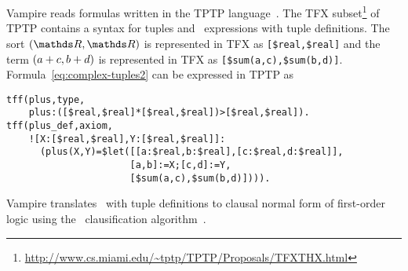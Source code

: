 Vampire reads formulas written in the TPTP language~\cite{tff0}. The TFX subset\footnote{\url{http://www.cs.miami.edu/~tptp/TPTP/Proposals/TFXTHX.html}} of TPTP contains a syntax for tuples and \LETIN\ expressions with tuple definitions. The sort $(\R,\R)$ is represented in TFX as \lstinline'[$real,$real]' and the term $({a+c,b+d})$ is represented in TFX as \lstinline'[$sum(a,c),$sum(b,d)]'. Formula~\ref{eq:complex-tuples2} can be expressed in TPTP as
\begin{lstlisting}[language=tptp]
tff(plus,type,
    plus:([$real,$real]*[$real,$real])>[$real,$real]).
tff(plus_def,axiom,
    ![X:[$real,$real],Y:[$real,$real]]:
      (plus(X,Y)=$let([[a:$real,b:$real],[c:$real,d:$real]],
                      [a,b]:=X;[c,d]:=Y,
                      [$sum(a,c),$sum(b,d)]))).
\end{lstlisting}

Vampire translates \LETIN\ with tuple definitions to clausal normal form of first-order logic using the \newcnf\ clausification algorithm~\cite{FOOLCNF}.

